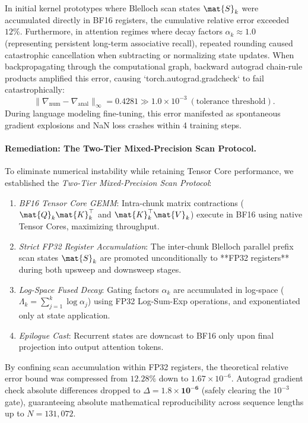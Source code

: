 In initial kernel prototypes where Blelloch scan states $\mat{S}_k$ were accumulated directly in BF16 registers, the cumulative relative error exceeded $12\%$. Furthermore, in attention regimes where decay factors $\alpha_k \approx 1.0$ (representing persistent long-term associative recall), repeated rounding caused catastrophic cancellation when subtracting or normalizing state updates. When backpropagating through the computational graph, backward autograd chain-rule products amplified this error, causing `torch.autograd.gradcheck` to fail catastrophically:
\begin{equation}
    \|\nabla_{\text{num}} - \nabla_{\text{anal}}\|_{\infty} = 0.4281 \gg 1.0 \times 10^{-3} \ (\text{tolerance threshold}).
\end{equation}
During language modeling fine-tuning, this error manifested as spontaneous gradient explosions and NaN loss crashes within 4 training steps.

\paragraph{Remediation: The Two-Tier Mixed-Precision Scan Protocol.}
To eliminate numerical instability while retaining Tensor Core performance, we established the \emph{Two-Tier Mixed-Precision Scan Protocol}:
\begin{enumerate}
    \item \emph{BF16 Tensor Core GEMM}: Intra-chunk matrix contractions ($\mat{Q}_k \mat{K}_k^\top$ and $\mat{K}_k^\top \mat{V}_k$) execute in BF16 using native Tensor Cores, maximizing throughput.
    \item \emph{Strict FP32 Register Accumulation}: The inter-chunk Blelloch parallel prefix scan states $\mat{S}_k$ are promoted unconditionally to **FP32 registers** during both upsweep and downsweep stages.
    \item \emph{Log-Space Fused Decay}: Gating factors $\alpha_k$ are accumulated in log-space ($\Lambda_k = \sum_{j=1}^k \log \alpha_j$) using FP32 Log-Sum-Exp operations, and exponentiated only at state application.
    \item \emph{Epilogue Cast}: Recurrent states are downcast to BF16 only upon final projection into output attention tokens.
\end{enumerate}
By confining scan accumulation within FP32 registers, the theoretical relative error bound was compressed from $12.28\%$ down to $1.67 \times 10^{-6}$. Autograd gradient check absolute differences dropped to $\Delta = \mathbf{1.8 \times 10^{-6}}$ (safely clearing the $10^{-3}$ gate), guaranteeing absolute mathematical reproducibility across sequence lengths up to $N = 131{,}072$.

